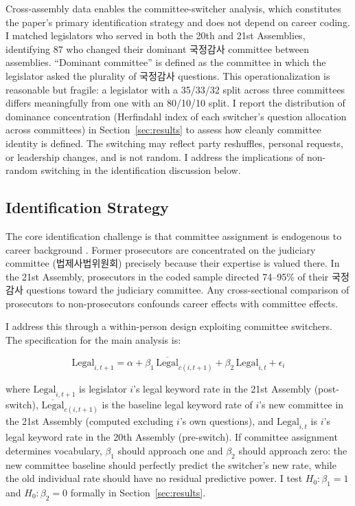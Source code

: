 \documentclass[11pt]{article}
\begin{document}
Cross-assembly data enables the committee-switcher analysis, which constitutes the paper's primary identification strategy and does not depend on career coding. I matched legislators who served in both the 20th and 21st Assemblies, identifying 87 who changed their dominant 국정감사 committee between assemblies. ``Dominant committee'' is defined as the committee in which the legislator asked the plurality of 국정감사 questions. This operationalization is reasonable but fragile: a legislator with a 35/33/32 split across three committees differs meaningfully from one with an 80/10/10 split. I report the distribution of dominance concentration (Herfindahl index of each switcher's question allocation across committees) in Section~\ref{sec:results} to assess how cleanly committee identity is defined. The switching may reflect party reshuffles, personal requests, or leadership changes, and is not random. I address the implications of non-random switching in the identification discussion below.

\subsection{Identification Strategy}
\label{sec:id}

The core identification challenge is that committee assignment is endogenous to career background \citep{mickler2017}. Former prosecutors are concentrated on the judiciary committee (법제사법위원회) precisely because their expertise is valued there. In the 21st Assembly, prosecutors in the coded sample directed 74--95\% of their 국정감사 questions toward the judiciary committee. Any cross-sectional comparison of prosecutors to non-prosecutors confounds career effects with committee effects.

I address this through a within-person design exploiting committee switchers. The specification for the main analysis is:

\begin{equation}
\text{Legal}_{i,t+1} = \alpha + \beta_1 \, \overline{\text{Legal}}_{c(i,t+1)} + \beta_2 \, \text{Legal}_{i,t} + \epsilon_i
\label{eq:switcher}
\end{equation}

\noindent where $\text{Legal}_{i,t+1}$ is legislator $i$'s legal keyword rate in the 21st Assembly (post-switch), $\overline{\text{Legal}}_{c(i,t+1)}$ is the baseline legal keyword rate of $i$'s new committee in the 21st Assembly (computed excluding $i$'s own questions), and $\text{Legal}_{i,t}$ is $i$'s legal keyword rate in the 20th Assembly (pre-switch). If committee assignment determines vocabulary, $\beta_1$ should approach one and $\beta_2$ should approach zero: the new committee baseline should perfectly predict the switcher's new rate, while the old individual rate should have no residual predictive power. I test $H_0\!: \beta_1 = 1$ and $H_0\!: \beta_2 = 0$ formally in Section~\ref{sec:results}.
\end{document}
